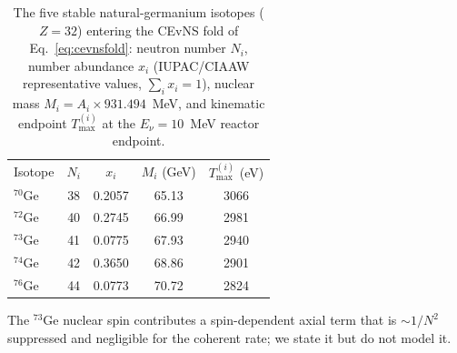 \begin{table}[t]
\centering
\caption{The five stable natural-germanium isotopes ($Z=32$) entering the CEvNS fold of Eq.~\eqref{eq:cevnsfold}: neutron number $N_i$, number abundance $x_i$ (IUPAC/CIAAW representative values, $\sum_i x_i=1$), nuclear mass $M_i=A_i\times931.494$~MeV, and kinematic endpoint $T_{\max}^{(i)}$ at the $E_\nu=10$~MeV reactor endpoint.}
\label{tab:ge-isotopes}
\begin{ruledtabular}
\begin{tabular}{lcccc}
Isotope & $N_i$ & $x_i$ & $M_i$ (GeV) & $T_{\max}^{(i)}$ (eV) \\
\colrule
${}^{70}$Ge & 38 & 0.2057 & 65.13 & 3066 \\
${}^{72}$Ge & 40 & 0.2745 & 66.99 & 2981 \\
${}^{73}$Ge & 41 & 0.0775 & 67.93 & 2940 \\
${}^{74}$Ge & 42 & 0.3650 & 68.86 & 2901 \\
${}^{76}$Ge & 44 & 0.0773 & 70.72 & 2824 \\
\end{tabular}
\end{ruledtabular}
\end{table}

The ${}^{73}$Ge nuclear spin contributes a spin-dependent axial term that is $\sim\!1/N^2$ suppressed and negligible for the coherent rate; we state it but do not model it.
